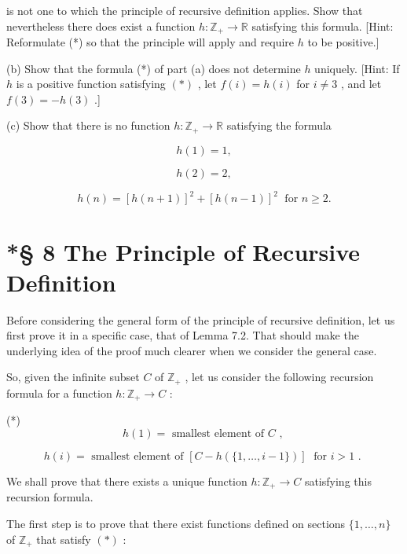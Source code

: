 is not one to which the principle of recursive definition applies. Show that nevertheless there does exist a function \(h : {\mathbb{Z}}_{ + } \rightarrow  \mathbb{R}\) satisfying this formula. [Hint: Reformulate (*) so that the principle will apply and require \(h\) to be positive.]

(b) Show that the formula (*) of part (a) does not determine \(h\) uniquely. [Hint: If \(h\) is a positive function satisfying \(\left( *\right)\) , let \(f\left( i\right)  = h\left( i\right)\) for \(i \neq  3\) , and let \(f\left( 3\right)  =  - h\left( 3\right)\) .]

(c) Show that there is no function \(h : {\mathbb{Z}}_{ + } \rightarrow  \mathbb{R}\) satisfying the formula

\[
h\left( 1\right)  = 1,
\]

\[
h\left( 2\right)  = 2,
\]

\[
h\left( n\right)  = {\left\lbrack  h\left( n + 1\right) \right\rbrack  }^{2} + {\left\lbrack  h\left( n - 1\right) \right\rbrack  }^{2}\;\text{ for }n \geq  2.
\]

\section*{*§ 8 The Principle of Recursive Definition}

Before considering the general form of the principle of recursive definition, let us first prove it in a specific case, that of Lemma 7.2. That should make the underlying idea of the proof much clearer when we consider the general case.

So, given the infinite subset \(C\) of \({\mathbb{Z}}_{ + }\) , let us consider the following recursion formula for a function \(h : {\mathbb{Z}}_{ + } \rightarrow  C\) :

(*)
\[
h\left( 1\right)  = \text{ smallest element of }C\text{ , }
\]

\[
h\left( i\right)  = \text{ smallest element of }\left\lbrack  {C - h\left( {\{ 1,\ldots ,i - 1\} }\right) }\right\rbrack  \;\text{ for }i > 1\text{ . }
\]

We shall prove that there exists a unique function \(h : {\mathbb{Z}}_{ + } \rightarrow  C\) satisfying this recursion formula.

The first step is to prove that there exist functions defined on sections \(\{ 1,\ldots ,n\}\) of \({\mathbb{Z}}_{ + }\) that satisfy \(\left( *\right)\) :

